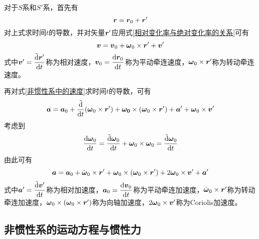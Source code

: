对于$S$系和$S'$系，首先有
\begin{equation*}
	\boldsymbol{r} = \boldsymbol{r}_0 + \boldsymbol{r}'
\end{equation*}
对上式求时间$t$的导数，并对矢量$\boldsymbol{r}'$应用式\eqref{相对变化率与绝对变化率的关系}可有
\begin{equation}
	\boldsymbol{v} = \boldsymbol{v}_0 + \boldsymbol{\omega}_0 \times \boldsymbol{r}' + \boldsymbol{v}'
	\label{非惯性系中的速度}
\end{equation}
式中$\boldsymbol{v}' = \dfrac{\tilde{\mathrm{d}} \boldsymbol{r}'}{\mathrm{d} t}$称为{\heiti 相对速度}，$\boldsymbol{v}_0 = \dfrac{\mathrm{d} \boldsymbol{r}_0}{\mathrm{d} t}$称为{\heiti 平动牵连速度}，$\boldsymbol{\omega}_0 \times \boldsymbol{r}'$称为{\heiti 转动牵连速度}。

再对式\eqref{非惯性系中的速度}求时间$t$的导数，可有
\begin{align*}
	\boldsymbol{a} = \boldsymbol{a}_0 + \frac{\tilde{\mathrm{d}}}{\mathrm{d} t} (\boldsymbol{\omega}_0 \times \boldsymbol{r}') + \boldsymbol{\omega_0} \times (\boldsymbol{\omega}_0 \times \boldsymbol{r}') + \boldsymbol{a}' + \boldsymbol{\omega}_0 \times \boldsymbol{v}'
\end{align*}
考虑到
\begin{equation*}
	\frac{\mathrm{d} \boldsymbol{\omega}_0}{\mathrm{d} t} = \frac{\tilde{\mathrm{d}} \boldsymbol{\omega}_0}{\mathrm{d} t} + \boldsymbol{\omega}_0 \times \boldsymbol{\omega}_0 = \frac{\tilde{\mathrm{d}} \boldsymbol{\omega}_0}{\mathrm{d} t}
\end{equation*}
由此可有
\begin{equation}
	\boldsymbol{a} = \boldsymbol{a}_0 + \dot{\boldsymbol{\omega}}_0 \times \boldsymbol{r}' + \boldsymbol{\omega}_0 \times (\boldsymbol{\omega}_0 \times \boldsymbol{r}') + 2\boldsymbol{\omega}_0 \times \boldsymbol{v}' + \boldsymbol{a}'
\end{equation}
式中$\boldsymbol{a}' = \dfrac{\tilde{\mathrm{d}} \boldsymbol{v}'}{\mathrm{d} t}$称为{\heiti 相对加速度}，$\boldsymbol{a}_0 = \dfrac{\mathrm{d} \boldsymbol{v}_0}{\mathrm{d} t}$称为{\heiti 平动牵连加速度}，$\dot{\boldsymbol{\omega}}_0 \times \boldsymbol{r}'$称为{\heiti 转动牵连加速度}，$\boldsymbol{\omega}_0 \times (\boldsymbol{\omega}_0 \times \boldsymbol{r}')$称为{\heiti 向轴加速度}，$2\boldsymbol{\omega}_0 \times \boldsymbol{v}'$称为{\heiti Coriolis加速度}。

\subsection{非惯性系的运动方程与惯性力}


